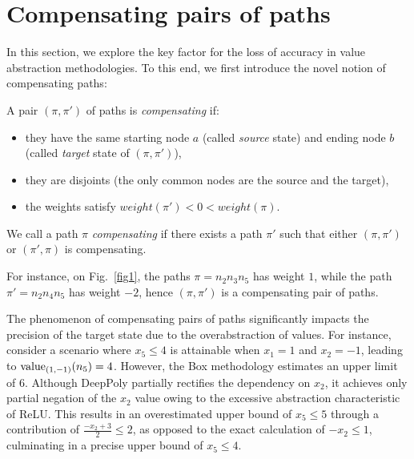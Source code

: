 


\section{Compensating pairs of paths}
\label{Sec.comp}

In this section, we explore the key factor for the loss of accuracy in value 
abstraction methodologies. To this end, we first introduce the novel notion of compensating paths:

\begin{definition}
A pair $(\pi,\pi')$ of paths is {\em compensating} if:
\begin{itemize}
	\item they have the same starting node $a$ (called {\em source} state) and ending node $b$ (called {\em target} state of $(\pi,\pi')$),
	\item they are disjoints (the only common nodes are the source and the target),
	\item the weights satisfy $weight(\pi') < 0 < weight(\pi)$.
\end{itemize}	
We call a path $\pi$ {\em compensating} if there exists a path $\pi'$ such that either $(\pi,\pi')$ or $(\pi',\pi)$ is compensating.
\end{definition}

\begin{example}
	For instance, on Fig.~\ref{fig1}, the paths $\pi= n_2 n_3 n_5$ has weight $1$, while the
	path $\pi'= n_2 n_4 n_5$ has weight $-2$, hence $(\pi,\pi')$ is a compensating pair of paths.
	\end{example}


The phenomenon of compensating pairs of paths significantly impacts the precision of the target state due to the overabstraction of values. For instance, consider a scenario where $x_5 \leq 4$ is attainable when $x_1=1$ and $x_2=-1$, leading to ${\textrm{value}}_{(1,-1)}(n_5)=4$. However, the Box methodology estimates an upper limit of $6$. Although DeepPoly partially rectifies the dependency on $x_2$, it achieves only partial negation of the $x_2$ value owing to the excessive abstraction characteristic of ReLU. This results in an overestimated upper bound of $x_5 \leq 5$ through a contribution of $\frac{-x_2+3}{2} \leq 2$, as opposed to the exact calculation of $-x_2 \leq 1$, culminating in a precise upper bound of $x_5 \leq 4$.

